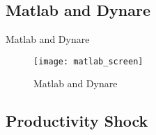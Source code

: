 \documentclass[
presentation.tex
]{subfiles}
\begin{document}

\subsection{Matlab and Dynare}

\begin{frame}{Matlab and Dynare}
	
	\begin{figure}[h!]
		\centering
		\texttt{[image: matlab\_screen]}
		\caption{Matlab and Dynare}
		\label{fig:matlab}
	\end{figure}
	
\end{frame}


\subsection{Productivity Shock}
\end{document}
